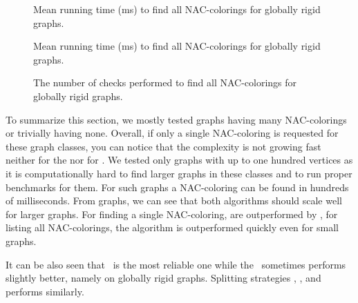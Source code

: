 \begin{figure}[p]
	\centering
	\scalebox{0.5}{}
	\caption[Mean runtime for globally rigid graphs (some).]{
		Mean running time (ms) to find all NAC-colorings for globally rigid graphs.}%
	\label{fig:graph_globally_rigid_first_runtime}
\end{figure}
\begin{figure}[p]
	\centering
	\scalebox{0.5}{}
	\caption[Mean runtime for globally rigid graphs (all).]{
		Mean running time (ms) to find all NAC-colorings for globally rigid graphs.}%
	\label{fig:graph_globally_rigid_all_runtime}
\end{figure}
\begin{figure}[p]
	\centering
	\scalebox{0.5}{}
	\caption[Checks performed for globally rigid graphs (all).]{
		The number of checks performed to find all NAC-colorings for globally rigid graphs.}%
	\label{fig:graph_globally_rigid_all_checks}
\end{figure}

To summarize this section, we mostly tested graphs having many NAC-colorings
or trivially having none.
Overall, if only a single NAC-coloring is requested
for these graph classes, you can notice that the complexity
is not growing fast neither for the \NaiveCycles{} nor for \Subgraphs{}.
We tested only graphs with up to one hundred vertices
as it is computationally hard to find larger graphs in these classes
and to run proper benchmarks for them.
For such graphs a NAC-coloring can be found in hundreds of milliseconds.
From graphs, we can see that both algorithms should scale well for larger graphs.
For finding a single NAC-coloring, \Subgraphs{} are outperformed by \NaiveCycles{},
for listing all NAC-colorings, the \NaiveCycles{} algorithm
is outperformed quickly even for small graphs.

It can be also seen that \MergeLinear\ is the most reliable one
while the \SharedVertices\ sometimes performs slightly better,
namely on globally rigid graphs.
%
Splitting strategies \None{}, \CycleMask{}, \Neighbors{} and \NeighborsDegree{}
performs similarly.

